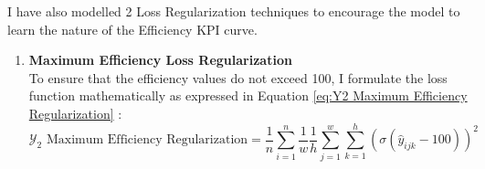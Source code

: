 \documentclass{report} %
\begin{document}
I have also modelled 2 Loss Regularization techniques to encourage the model to learn the nature of the Efficiency \ac{KPI} curve.
\begin{enumerate}
\item \textbf{Maximum Efficiency Loss Regularization} \\
To ensure that the efficiency values do not exceed 100, I formulate the loss function mathematically as expressed in Equation \ref{eq:Y2 Maximum Efficiency Regularization} :
\begin{equation}
\text{$\mathcal{Y}_2$ Maximum Efficiency Regularization} = \frac{1}{n} \sum_{i=1}^{n}\frac{1}{w} \frac{1}{h} \sum_{j=1}^{w} \sum_{k=1}^{h}\left(\sigma(\hat{y}_{ijk} - 100)\right)^2 
\label{eq:Y2 Maximum Efficiency Regularization}
\end{equation} 


\end{enumerate}
\end{document}
